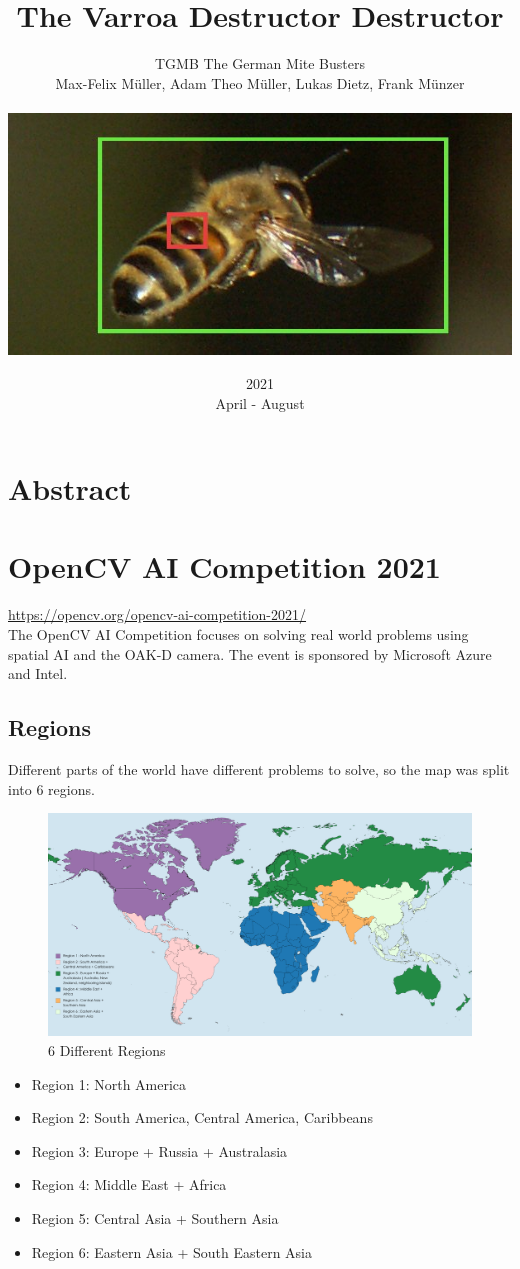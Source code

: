 \documentclass[a4paper,titlepage]{article}
\title{The Varroa Destructor Destructor}
\date{2021\\ April - August}
\author{TGMB The German Mite Busters\\ Max-Felix Müller, Adam Theo Müller, Lukas Dietz, Frank Münzer\\ \\ \includegraphics[width=\textwidth]{Biene_mit_Varroa_erkannt.jpg}}
\begin{document}
\maketitle
\tableofcontents
\newpage
\listoffigures %
\listoftables %
\newpage

\section*{Abstract}

\newpage
\section{OpenCV AI Competition 2021}

\href{https://opencv.org/opencv-ai-competition-2021/}{https://opencv.org/opencv-ai-competition-2021/} \\

The OpenCV AI Competition focuses on solving real world problems using spatial AI and the OAK-D camera.
The event is sponsored by Microsoft Azure and Intel.

\subsection{Regions}

Different parts of the world have different problems to solve, so the map was split into 6 regions.

\begin{figure}[H]
    \includegraphics[width=\textwidth]{MapChart_Map-2048x1079.png}
    \caption{6 Different Regions}
\end{figure}

\begin{itemize}
    \item Region 1: North America
    \item Region 2: South America, Central America, Caribbeans
    \item Region 3: Europe + Russia + Australasia
    \item Region 4: Middle East + Africa
    \item Region 5: Central Asia + Southern Asia
    \item Region 6: Eastern Asia + South Eastern Asia
\end{itemize}
\end{document}
